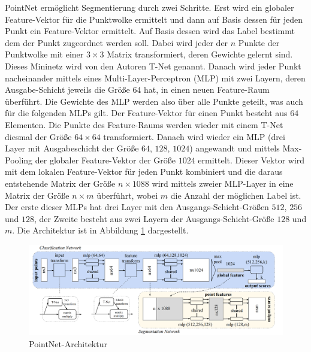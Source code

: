 \documentclass[12pt,titlepage, twoside]{article}
\begin{document}
PointNet ermöglicht Segmentierung durch zwei Schritte. Erst wird ein globaler Feature-Vektor für die Punktwolke ermittelt und dann auf Basis dessen für jeden Punkt ein Feature-Vektor ermittelt.
Auf Basis dessen wird das Label bestimmt dem der Punkt zugeordnet werden soll. 
Dabei wird jeder der $n$ Punkte der Punktwolke mit einer $3\times 3$ Matrix transformiert, deren Gewichte gelernt sind. Dieses Mininetz wird von den Autoren T-Net genannt.
Danach wird jeder Punkt nacheinander mittels eines Multi-Layer-Perceptron (MLP) mit zwei Layern, deren Ausgabe-Schicht jeweils die Größe $64$ hat, in einen neuen Feature-Raum überführt. 
Die Gewichte des MLP werden also über alle Punkte geteilt, was auch für die folgenden MLPs gilt. Der Feature-Vektor für einen Punkt besteht aus $64$ Elementen.
Die Punkte des Feature-Raums werden wieder mit einem T-Net diesmal der Größe $64\times 64$ transformiert. 
Danach wird wieder ein MLP (drei Layer mit Ausgabeschicht der Größe $64$, $128$, $1024$) angewandt und mittels Max-Pooling der globaler Feature-Vektor der Größe $1024$ ermittelt. 
Dieser Vektor wird mit dem lokalen Feature-Vektor für jeden Punkt kombiniert und die daraus entstehende Matrix der Größe $n\times 1088$ wird mittels zweier MLP-Layer in eine Matrix der Größe $n\times m$ überführt, wobei $m$ die Anzahl der möglichen Label ist.
Der erste dieser MLPs hat drei Layer mit den Ausgangs-Schicht-Größen $512$, $256$ und $128$, der Zweite besteht aus zwei Layern der Ausgangs-Schicht-Größe $128$ und $m$.
Die Architektur ist in Abbildung \ref{fig:point:net:arch} dargestellt.

\begin{figure}
    \centering
    \includegraphics[width=1.0\textwidth]{./Images/PointNetArchitektur.png}
    \caption{PointNet-Architektur \cite{qi2017pointnet}}
    \label{fig:point:net:arch}
\end{figure}
\end{document}
